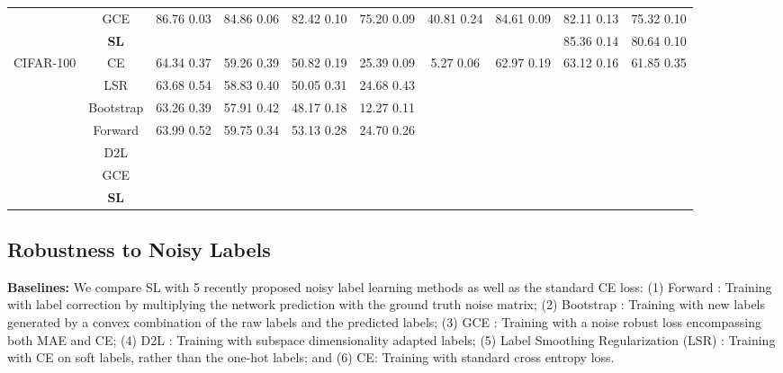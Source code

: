 \documentclass[10pt,twocolumn,letterpaper]{article}
\begin{document}
\begin{table*}[!t]
\begin{adjustbox}{width=1\textwidth}
\begin{tabular}{c|c|ccccc|ccc}
 & GCE & 86.76  0.03 & 84.86  0.06 & 82.42  0.10 & 75.20  0.09 & 40.81  0.24 & 84.61  0.09 & 82.11  0.13 & 75.32  0.10 \\
 & \textbf{SL} &  &  &  &  &  &  & 85.36  0.14 & 80.64  0.10 \\ \hline
\hline
\multirow{7}{*}{CIFAR-100} & CE & 64.34  0.37 & 59.26  0.39 & 50.82  0.19 & 25.39  0.09 & 5.27  0.06 & 62.97  0.19 & 63.12  0.16 & 61.85  0.35 \\
 & LSR & 63.68  0.54 & 58.83  0.40 & 50.05  0.31 & 24.68  0.43 &  &  &  &  \\
 & Bootstrap & 63.26  0.39 & 57.91  0.42 & 48.17  0.18 & 12.27  0.11 &  &  &  &  \\
 & Forward & 63.99  0.52 & 59.75  0.34 & 53.13  0.28 & 24.70  0.26 &  &  &  & \\
 & D2L &  &  &  &  &  &  &  &  \\
 & GCE &  &  &  &  &  &  &  &  \\
 & \textbf{SL} &  &  &  &  &  &  &  & 
\\ \hline
\end{tabular}
\end{adjustbox}
\label{result_table}
\vspace{-0.15 in}
\end{table*}

\subsection{Robustness to Noisy Labels}\label{benckmark_robust}

\noindent\textbf{Baselines:} We compare SL with 5 recently proposed noisy label learning methods as well as the standard CE loss: (1) Forward \cite{patrini2017making}: Training with label correction by multiplying the network prediction with the ground truth noise matrix; (2) Bootstrap \cite{reed2014training}: Training with new labels generated by a convex combination of the raw labels and the predicted labels; (3) GCE \cite{zhang2018generalized}: Training with a noise robust loss encompassing both MAE and CE; (4) D2L \cite{ma2018dimensionality}: Training with subspace dimensionality adapted labels; (5) Label Smoothing Regularization (LSR) \cite{pereyra2017regularizing}: Training with CE on soft labels, rather than the one-hot labels; and (6) CE: Training with standard cross entropy loss.
\end{document}
